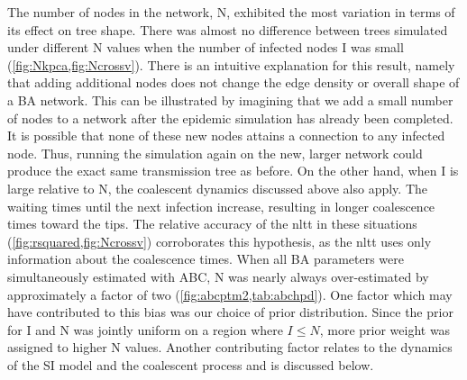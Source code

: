 The number of nodes in the network, \gls{N}, exhibited the most variation in
terms of its effect on tree shape. There was almost no difference between trees
simulated under different \gls{N} values when the number of infected nodes
\gls{I} was small (\cref{fig:Nkpca,fig:Ncrossv}). There is an intuitive
explanation for this result, namely that adding additional nodes does not
change the edge density or overall shape of a \gls{BA} network.  This can be illustrated by imagining that we add a small
number of nodes to a network after the epidemic simulation has already been
completed. It is possible that none of these new nodes attains a connection to
any infected node. Thus, running the simulation again on the new, larger
network could produce the exact same transmission tree as before. On the other
hand, when \gls{I} is large relative to \gls{N}, the coalescent dynamics
discussed above also apply. The waiting times until the next infection
increase, resulting in longer coalescence times toward the tips. The relative
accuracy of the \gls{nltt} in these situations
(\cref{fig:rsquared,fig:Ncrossv}) corroborates this hypothesis, as the
\gls{nltt} uses only information about the coalescence times. When all \gls{BA}
parameters were simultaneously estimated with \gls{ABC}, \gls{N} was nearly
always over-estimated by approximately a factor of two
(\cref{fig:abcptm2,tab:abchpd}). One factor which may have contributed to this
bias was our choice of prior distribution. Since the prior for \gls{I} and
\gls{N} was jointly uniform on a region where $I \leq N$, more prior weight was
assigned to higher \gls{N} values. Another contributing factor relates to the
dynamics of the \gls{SI} model and the coalescent process and is discussed
below.


